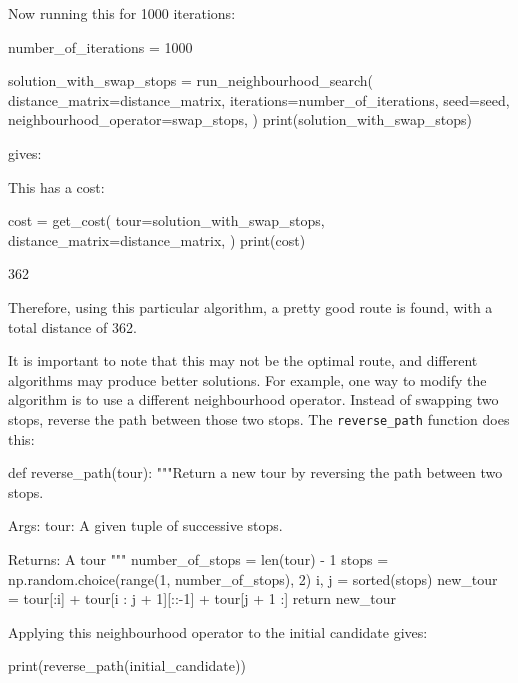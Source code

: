 Now running this for 1000 iterations:

\begin{pyin}
number_of_iterations = 1000

solution_with_swap_stops = run_neighbourhood_search(
    distance_matrix=distance_matrix,
    iterations=number_of_iterations,
    seed=seed,
    neighbourhood_operator=swap_stops,
)
print(solution_with_swap_stops)
\end{pyin}

gives:

\begin{pyout}
[0, 7, 2, 8, 5, 3, 1, 9, 12, 11, 4, 10, 6, 0]
\end{pyout}

This has a cost:

\begin{pyin}
cost = get_cost(
    tour=solution_with_swap_stops,
    distance_matrix=distance_matrix,
)
print(cost)
\end{pyin}

\begin{pyout}
362
\end{pyout}

Therefore, using this particular algorithm, a pretty good route is found, with a
total distance of 362.

It is important to note that this may not be the optimal route, and different algorithms
may produce better solutions.
For example, one way to modify the algorithm is to use a different neighbourhood operator.
Instead of swapping two stops, reverse the path between those two
stops. The \texttt{reverse_path} function does this:

\begin{pyin}
def reverse_path(tour):
    """Return a new tour by reversing the path between two
    stops.

    Args:
        tour: A given tuple of successive stops.

    Returns:
        A tour
    """
    number_of_stops = len(tour) - 1
    stops = np.random.choice(range(1, number_of_stops), 2)
    i, j = sorted(stops)
    new_tour = tour[:i] + tour[i : j + 1][::-1] + tour[j + 1 :]
    return new_tour
\end{pyin}

Applying this neighbourhood operator to the initial candidate gives:

\begin{pyin}
print(reverse_path(initial_candidate))
\end{pyin}

